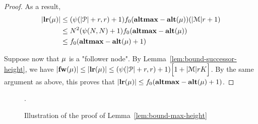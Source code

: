 \begin{proof}
	 As a result, 
	\begin{align*}
	|\mathbf{lr}(\mu)|& 
	\leq (\psi(|\mathcal{P}|+r,r)+1) f_0(\mathbf{altmax}-\mathbf{alt}(\mu))(|\mathcal{M}| r +1) \\&  
	\leq N^2(\psi(N,N) +1) f_0(\mathbf{altmax} - \mathbf{alt}(\mu)) \\& 
	\leq f_0(\mathbf{altmax} - \mathbf{alt}(\mu)+1)
	\end{align*}
	
	Suppose now that $\mu$ is a "follower node". By Lemma~\ref{lem:bound-successor-height}, we have 
	$|\mathbf{fw}(\mu)| \leq |\mathbf{lr}(\mu)| \leq (\psi(|\mathcal{P}|+r,r)+1) \Big[1+|\mathcal{M}|rK\Big]$.
	By the same argument as above, this proves that $|\mathbf{lr}(\mu)| \leq f_0(\mathbf{altmax} - \mathbf{alt}(\mu)+1)$.
\end{proof}

\begin{figure}[h]
	
	\caption{Illustration of the proof of Lemma~\ref{lem:bound-max-height}}.
	\label{fig:max-height-bound}
\end{figure}

\lemBoundMaxHeight*

